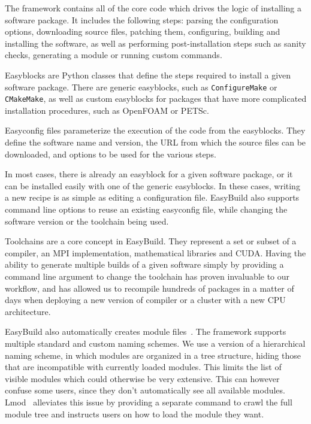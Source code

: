 \documentclass[sigconf]{acmart}
\begin{document}
The framework contains all of the core code which drives the logic of installing a software package. It includes the following steps: parsing the configuration options, downloading source files, patching them, configuring, building and installing the software, as well as performing post-installation steps such as sanity checks, generating a module or running custom commands. 

Easyblocks are Python classes that define the steps required to install a given software package. There are generic easyblocks, such as \texttt{ConfigureMake} or \texttt{CMakeMake}, as well as custom easyblocks for packages that have more complicated installation procedures, such as OpenFOAM or PETSc. 

Easyconfig files parameterize the execution of the code from the easyblocks. They define the software name and version, the URL from which the source files can be downloaded, and options to be used for the various steps. 

In most cases, there is already an easyblock for a given software package, or it can be installed easily with one of the generic easyblocks. In these cases, writing a new recipe is as simple as editing a configuration file. EasyBuild also supports command line options to reuse an existing easyconfig file, while changing the software version or the toolchain being used. 

Toolchains are a core concept in EasyBuild. They represent a set or subset of a compiler, an MPI implementation, mathematical libraries and CUDA. Having the ability to generate multiple builds of a given software simply by providing a command line argument to change the toolchain has proven invaluable to our workflow, and has allowed us to recompile hundreds of packages in a matter of days when deploying a new version of compiler or a cluster with a new CPU architecture. 

EasyBuild also automatically creates module files~\cite{Modules1991,Modules1996,Lmod}. The framework supports multiple standard and custom naming schemes. We use a version of a hierarchical naming scheme, in which modules are organized in a tree structure, hiding those that are incompatible with currently loaded modules. This limits the list of visible modules which could otherwise be very extensive. This can however confuse some users, since they don’t automatically see all available modules. Lmod~\cite{Lmod} alleviates this issue by providing a separate command to crawl the full module tree and instructs users on how to load the module they want.
\end{document}

